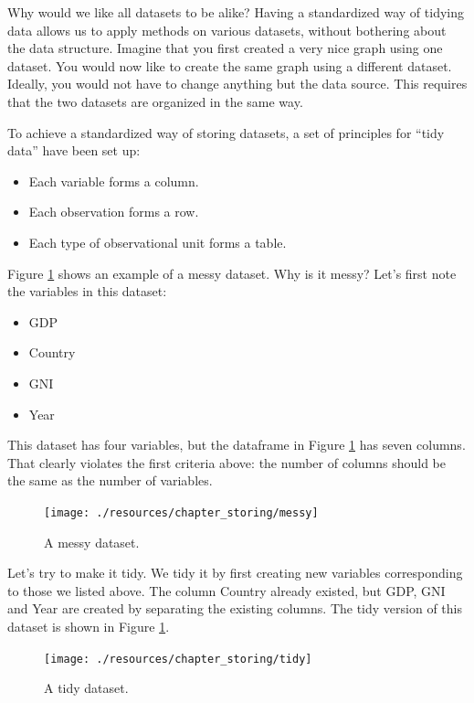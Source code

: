 \documentclass[
]{book}
\providecommand{\tightlist}{%
  \setlength{\itemsep}{0pt}\setlength{\parskip}{0pt}}
\begin{document}
Why would we like all datasets to be alike? Having a standardized way of tidying data allows us to apply methods on various datasets, without bothering about the data structure. Imagine that you first created a very nice graph using one dataset. You would now like to create the same graph using a different dataset. Ideally, you would not have to change anything but the data source. This requires that the two datasets are organized in the same way.

To achieve a standardized way of storing datasets, a set of principles for ``tidy data'' have been set up:

\begin{itemize}
\tightlist
\item
  Each variable forms a column.
\item
  Each observation forms a row.
\item
  Each type of observational unit forms a table.
\end{itemize}

Figure \ref{fig:store4} shows an example of a messy dataset. Why is it messy? Let's first note the variables in this dataset:

\begin{itemize}
\tightlist
\item
  GDP
\item
  Country
\item
  GNI
\item
  Year
\end{itemize}

This dataset has four variables, but the dataframe in Figure \ref{fig:store4} has seven columns. That clearly violates the first criteria above: the number of columns should be the same as the number of variables.

\begin{figure}

{\centering \texttt{[image: ./resources/chapter\_storing/messy]} 

}

\caption{A messy dataset.}\label{fig:store4}
\end{figure}

Let's try to make it tidy. We tidy it by first creating new variables corresponding to those we listed above. The column Country already existed, but GDP, GNI and Year are created by separating the existing columns. The tidy version of this dataset is shown in Figure \ref{fig:store4}.

\begin{figure}

{\centering \texttt{[image: ./resources/chapter\_storing/tidy]} 

}

\caption{A tidy dataset.}\label{fig:store5}
\end{figure}
\end{document}
